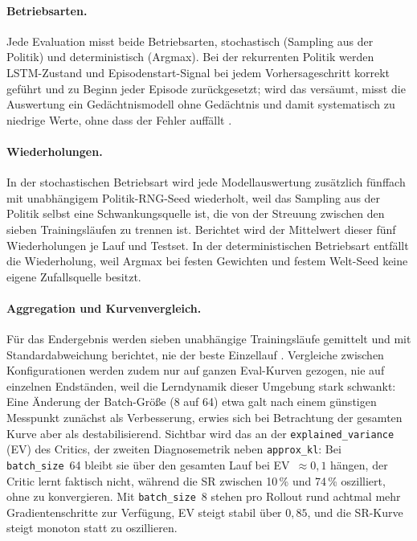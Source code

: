 \documentclass[11pt,a4paper]{article}
\begin{document}
\paragraph{Betriebsarten.}
Jede Evaluation misst beide Betriebsarten, stochastisch (Sampling aus der
Politik) und deterministisch (Argmax). Bei der rekurrenten Politik werden
LSTM-Zustand und Episodenstart-Signal bei jedem Vorhersageschritt korrekt
geführt und zu Beginn jeder Episode zurückgesetzt; wird das versäumt, misst
die Auswertung ein Gedächtnismodell ohne Gedächtnis und damit systematisch
zu niedrige Werte, ohne dass der Fehler auffällt \cite{kapturowski2019r2d2}.

\paragraph{Wiederholungen.}
In der stochastischen Betriebsart wird jede Modellauswertung zusätzlich
fünffach mit unabhängigem Politik-RNG-Seed wiederholt, weil das Sampling
aus der Politik selbst eine Schwankungsquelle ist, die von der Streuung
zwischen den sieben Trainingsläufen zu trennen ist. Berichtet wird der
Mittelwert dieser fünf Wiederholungen je Lauf und Testset. In der
deterministischen Betriebsart entfällt die Wiederholung, weil Argmax bei
festen Gewichten und festem Welt-Seed keine eigene Zufallsquelle besitzt.

\paragraph{Aggregation und Kurvenvergleich.}
Für das Endergebnis werden sieben unabhängige Trainingsläufe gemittelt und
mit Standardabweichung berichtet, nie der beste Einzellauf
\cite{henderson2018matters}. Vergleiche zwischen Konfigurationen werden
zudem nur auf ganzen Eval-Kurven gezogen, nie auf einzelnen Endständen, weil
die Lerndynamik dieser Umgebung stark schwankt: Eine Änderung der
Batch-Größe (8 auf 64) etwa galt nach einem günstigen Messpunkt zunächst als
Verbesserung, erwies sich bei Betrachtung der gesamten Kurve aber als
destabilisierend. Sichtbar wird das an der \texttt{explained\_variance} (EV)
des Critics, der zweiten Diagnosemetrik neben \texttt{approx\_kl}: Bei
\texttt{batch\_size}~64 bleibt sie über den gesamten Lauf bei EV~$\approx 0{,}1$
hängen, der Critic lernt faktisch nicht, während die SR zwischen 10\,\% und
74\,\% oszilliert, ohne zu konvergieren. Mit \texttt{batch\_size}~8 stehen pro
Rollout rund achtmal mehr Gradientenschritte zur Verfügung, EV steigt
stabil über $0{,}85$, und die SR-Kurve steigt monoton statt zu oszillieren.
\end{document}
